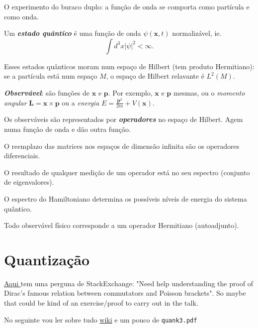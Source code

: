  O experimento do buraco duplo: a função de onda se comporta como part\'icula e como onda.

 \begin{defn}
 	Um \textit{\textbf{estado quântico}} é uma função de onda $\psi(\mathbf{x},t)$ normalizável, ie.
	\[\int d^3x|\psi|^2<\infty.\]
 \end{defn}
 Esses estados qu\^anticos moram num espaço de Hilbert (tem produto Hermitiano): se a part\'icula est\'a num espaço $M$, o espaço de Hilbert relavante \'e $L^2(M)$.

\begin{defn}
	\textit{\textbf{Observ\'avel}}: s\~ao fun\c c\~oes  de $\mathbf{x}$ e $\mathbf{p}$. Por exemplo, $\mathbf{x}$ e $\mathbf{p}$ mesmas, ou o \textit{momento angular} $\mathbf{L}=\mathbf{x}\times \mathbf{p}$ ou a \textit{energia} $E=\frac{\mathbf{p}^2}{2m}+V(\mathbf{x})$.

	Os observ\'aveis s\~ao representados por \textit{\textbf{operadores}} no espaço de Hilbert. Agem numa fun\c c\~ao de onda e d\~ao outra fun\c c\~ao.
\end{defn}

\begin{remark}
	O reemplazo das matrices nos espaços de dimens\~ao infinita s\~ao os operadores diferenciais.
\end{remark}

\begin{remark}
	O resultado de qualquer medi\c c\~ao de um operador est\'a no seu espectro (conjunto de eigenvalores).
\end{remark}

O espectro do Hamiltoniano determina os poss\'iveis n\'iveis de energia do sistema qu\^antico.

Todo observ\'avel f\'isico corresponde a um operador Hermitiano (autoadjunto).


\section{Quantização}

\href{https://math.stackexchange.com/questions/4540394/need-help-understanding-the-proof-of-diracs-famous-relation-between-commutators}{Aqui } tem uma perguna de StackExchange: "Need help understanding the proof of Dirac's famous relation between commutators and Poisson brackets". So maybe that could be kind of an exercise/proof to carry out in the talk.

No seguinte vou ler sobre tudo \href{https://en.wikipedia.org/wiki/Geometric_quantization}{wiki} e um pouco de  \texttt{quank3.pdf}

